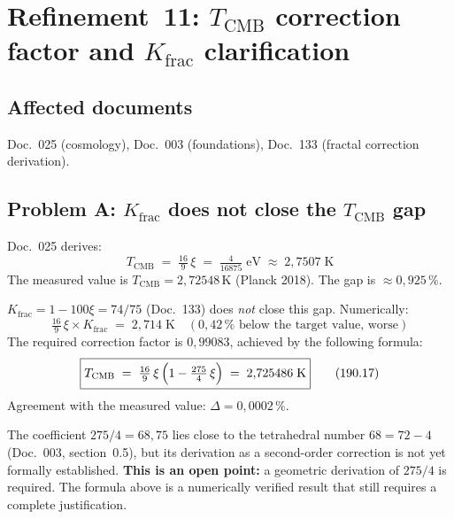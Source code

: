 \section{\texorpdfstring{Refinement~11: $T_\text{CMB}$ correction factor and $K_\text{frac}$ clarification}{Refinement 11: T\_CMB correction factor and K\_frac clarification}}

\subsection*{Affected documents}

Doc.~025 (cosmology), Doc.~003 (foundations), Doc.~133 (fractal correction derivation).

\subsection*{Problem A: $K_\text{frac}$ does not close the $T_\text{CMB}$ gap}

Doc.~025 derives:
\begin{equation}
  T_\text{CMB} \;=\; \tfrac{16}{9}\,\xi \;=\; \tfrac{4}{16875}\;\text{eV}
  \;\approx\; 2{,}7507\;\text{K}
  \tag{190.15}
\end{equation}
The measured value is $T_\text{CMB} = 2{,}72548\,\text{K}$ (Planck 2018). The
gap is $\approx 0{,}925\,\%$.

$K_\text{frac} = 1 - 100\xi = 74/75$ (Doc.~133) does \emph{not} close this gap.
Numerically:
\begin{equation}
  \tfrac{16}{9}\,\xi \times K_\text{frac} \;=\; 2{,}714\;\text{K}
  \quad (0{,}42\,\% \text{ below the target value, worse})
  \tag{190.16}
\end{equation}
The required correction factor is $0{,}99083$, achieved by the following
formula:
\begin{equation}
  \boxed{
    T_\text{CMB} \;=\; \tfrac{16}{9}\,\xi\,\Bigl(1 - \tfrac{275}{4}\,\xi\Bigr)
    \;=\; 2{,}725486\;\text{K}
  }
  \tag{190.17}
\end{equation}
Agreement with the measured value: $\Delta = 0{,}0002\,\%$.

The coefficient $275/4 = 68{,}75$ lies close to the tetrahedral number
$68 = 72 - 4$ (Doc.~003, section~0.5), but its derivation as a second-order
correction is not yet formally established. \textbf{This is an open point:} a
geometric derivation of $275/4$ is required. The formula above is a numerically
verified result that still requires a complete justification.

